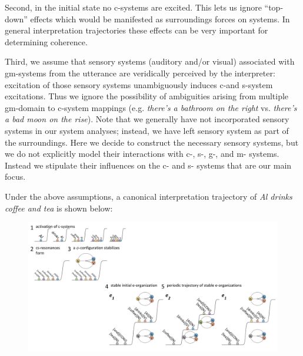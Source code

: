 Second, in the initial state no c-systems are excited. This lets us ignore “top-down” effects which would be manifested as surroundings forces on systems. In general interpretation trajectories these effects can be very important for determining coherence.

Third, we assume that sensory systems (auditory and/or visual) associated with gm-systems from the utterance are veridically perceived by the interpreter: excitation of those sensory systems unambiguously induces c-and s-system excitations. Thus we ignore the possibility of ambiguities arising from multiple gm-domain to c-system mappings (e.g. \textit{there’s a bathroom on the right} vs. \textit{there’s a bad moon on the rise}). Note that we generally have not incorporated sensory systems in our system analyses; instead, we have left sensory system as part of the surroundings. Here we decide to construct the necessary sensory systems, but we do not explicitly model their interactions with c-, s-, g-, and m- systems. Instead we stipulate their influences on the c- and s- systems that are our main focus.

Under the above assumptions, a canonical interpretation trajectory of \textit{Al drinks coffee and tea} is shown below:

  
\begin{figure}
\includegraphics[width=\textwidth]{figures/Tilsen-img121.png}
\caption{\missingcaption}
\label{fig:6:2}
\end{figure}

